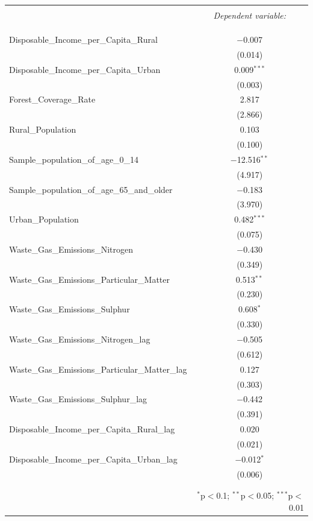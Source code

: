 \documentclass[
]{article}
\begin{document}
\begin{table}[!htbp] \centering 
	\caption{} 
	\label{} 
	\begin{tabular}{@{\extracolsep{5pt}}lc} 
		\\[-1.8ex]\hline 
		\hline \\[-1.8ex] 
		& \multicolumn{1}{c}{\textit{Dependent variable:}} \\ 
		\cline{2-2} 
		\\[-1.8ex] &   \\ 
		\hline \\[-1.8ex] 
		Disposable\_Income\_per\_Capita\_Rural & $-$0.007 \\ 
		& (0.014) \\ 
		Disposable\_Income\_per\_Capita\_Urban & 0.009$^{***}$ \\ 
		& (0.003) \\ 
		Forest\_Coverage\_Rate & 2.817 \\ 
		& (2.866) \\ 
		Rural\_Population & 0.103 \\ 
		& (0.100) \\ 
		Sample\_population\_of\_age\_0\_14 & $-$12.516$^{**}$ \\ 
		& (4.917) \\ 
		Sample\_population\_of\_age\_65\_and\_older & $-$0.183 \\ 
		& (3.970) \\ 
		Urban\_Population & 0.482$^{***}$ \\ 
		& (0.075) \\ 
		Waste\_Gas\_Emissions\_Nitrogen & $-$0.430 \\ 
		& (0.349) \\ 
		Waste\_Gas\_Emissions\_Particular\_Matter & 0.513$^{**}$ \\ 
		& (0.230) \\ 
		Waste\_Gas\_Emissions\_Sulphur & 0.608$^{*}$ \\ 
		& (0.330) \\ 
		Waste\_Gas\_Emissions\_Nitrogen\_lag & $-$0.505 \\ 
		& (0.612) \\ 
		Waste\_Gas\_Emissions\_Particular\_Matter\_lag & 0.127 \\ 
		& (0.303) \\ 
		Waste\_Gas\_Emissions\_Sulphur\_lag & $-$0.442 \\ 
		& (0.391) \\ 
		Disposable\_Income\_per\_Capita\_Rural\_lag & 0.020 \\ 
		& (0.021) \\ 
		Disposable\_Income\_per\_Capita\_Urban\_lag & $-$0.012$^{*}$ \\ 
		& (0.006) \\ 
		\hline \\[-1.8ex] 
		\hline 
		\hline \\[-1.8ex] 
		\text{}  & \multicolumn{1}{r}{$^{*}$p$<$0.1; $^{**}$p$<$0.05; $^{***}$p$<$0.01} \\ 
	\end{tabular} 
\end{table}
\end{document}

